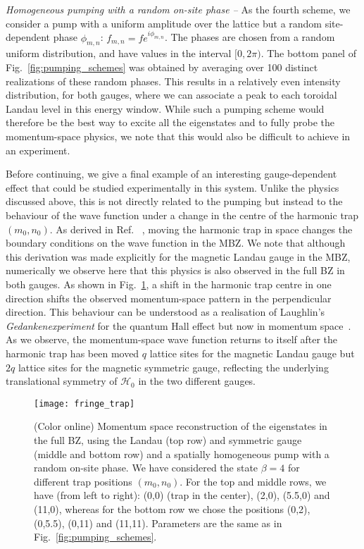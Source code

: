 \documentclass[twocolumn, 10pt, aps, superscriptaddress, floatfix, showpacs, pra, citeautoscript]{revtex4-1}
\begin{document}
{\em{Homogeneous pumping with a random on-site phase --}} As the fourth scheme, we consider a pump with a uniform amplitude over the lattice but a random site-dependent phase $\phi_{m,n}$:
$f_{m,n}=fe^{i\phi_{m,n}}$. The phases are chosen from a random
uniform distribution, and have values in the interval $[0,2\pi)$. The
bottom panel of Fig.~\ref{fig:pumping_schemes} was obtained by
averaging over 100 distinct realizations of these random phases. This
results in a relatively even intensity distribution, for both gauges, where we can associate a peak to each toroidal Landau level in this energy window. While such a pumping scheme would therefore be the best way to excite all the eigenstates and to fully probe the momentum-space physics, we note that this would also be difficult to achieve in an experiment.

Before continuing, we give a final example of an interesting gauge-dependent effect that could be studied experimentally in this system. Unlike the physics discussed above, this is not directly related to the pumping but instead to the behaviour of the wave function under a change in the centre of the harmonic trap $(m_0, n_0)$. As derived in Ref. ~, moving the
harmonic trap in space changes the boundary conditions on the wave function in the MBZ. We note that although this derivation was made explicitly for the magnetic Landau gauge in the MBZ, numerically we observe here that this physics is also observed in the full BZ in both gauges. 
As shown in Fig.~\ref{fig:moving_trap}, a shift in the harmonic trap centre in one direction shifts the observed momentum-space pattern in the perpendicular direction. This behaviour can be understood as a realisation of Laughlin's {\em Gedankenexperiment} for the quantum Hall effect but now in momentum space~\cite{ozawa2014momhh}. As we observe, the momentum-space wave function returns to itself after the harmonic trap has been moved $q$ lattice sites for the magnetic Landau gauge but $2q$ lattice sites for the magnetic symmetric gauge, reflecting the underlying translational symmetry of $\mathcal{H}_0$ in the two different gauges. 


\begin{figure}[htb]
  \centering
  \texttt{[image: fringe\_trap]} %
  \caption{(Color online) Momentum space reconstruction of the eigenstates in the
    full BZ, using the Landau (top row) and symmetric gauge (middle
    and bottom row) and a spatially homogeneous pump with
    a random on-site phase. We have considered the state $\beta = 4$ for
    different trap positions $(m_0, n_0)$. For the top and middle
    rows, we have (from left to right): (0,0) (trap in the center),
    (2,0), (5.5,0) and (11,0), whereas for the bottom row we chose the
    positions (0,2), (0,5.5), (0,11) and (11,11). Parameters are the same as in Fig.~\ref{fig:pumping_schemes}.}
  \label{fig:moving_trap}
\end{figure}
\end{document}
